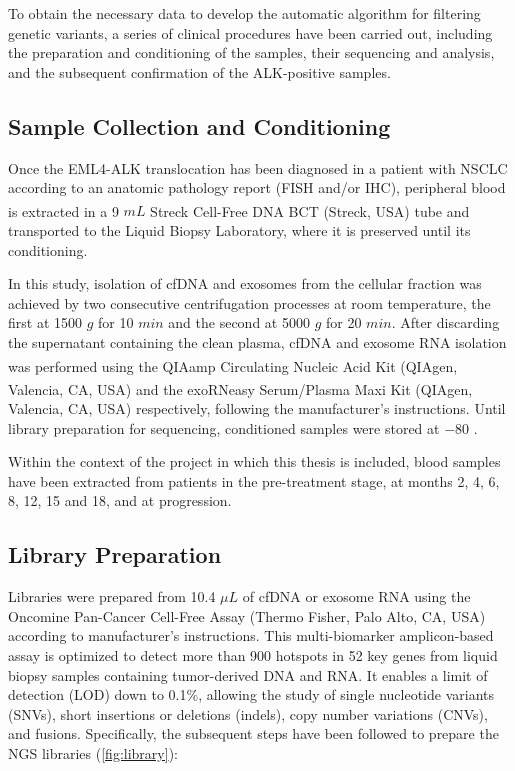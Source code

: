 To obtain the necessary data to develop the automatic algorithm for filtering genetic variants, a series of clinical procedures have been carried out, including the preparation and conditioning of the samples, their sequencing and analysis, and the subsequent confirmation of the ALK-positive samples.

\subsection{Sample Collection and Conditioning}

Once the EML4-ALK translocation has been diagnosed in a patient with NSCLC according to an anatomic pathology report (FISH and\slash or IHC), peripheral blood is extracted in a 9 $mL$ Streck Cell-Free DNA BCT\textsuperscript\textregistered{} (Streck, USA) tube and transported to the Liquid Biopsy Laboratory, where it is preserved until its conditioning.

In this study, isolation of cfDNA and exosomes from the cellular fraction was achieved by two consecutive centrifugation processes at room temperature, the first at 1500 $g$ for 10 $min$ and the second at 5000 $g$ for 20 $min$. After discarding the supernatant containing the clean plasma, cfDNA and exosome RNA isolation was performed using the QIAamp\textsuperscript\textregistered{} Circulating Nucleic Acid Kit (QIAgen, Valencia, CA, USA) and the exoRNeasy\textsuperscript\textregistered{} Serum/Plasma Maxi Kit (QIAgen, Valencia, CA, USA) respectively, following the manufacturer's instructions. Until library preparation for sequencing, conditioned samples were stored at $-80$ .

Within the context of the project in which this thesis is included, blood samples have been extracted from patients in the pre-treatment stage, at months 2, 4, 6, 8, 12, 15 and 18, and at progression.

\subsection{Library Preparation}

Libraries were prepared from 10.4 $\mu L$ of cfDNA or exosome RNA using the Oncomine\texttrademark{} Pan-Cancer Cell-Free Assay (Thermo Fisher, Palo Alto, CA, USA) according to manufacturer's instructions. This multi-biomarker amplicon-based assay is optimized to detect more than 900 hotspots in 52 key genes from liquid biopsy samples containing tumor-derived DNA and RNA. It enables a limit of detection (LOD) down to 0.1\%, allowing the study of single nucleotide variants (SNVs), short insertions or deletions (indels), copy number variations (CNVs), and fusions. Specifically, the subsequent steps have been followed to prepare the NGS libraries (\autoref{fig:library}):

